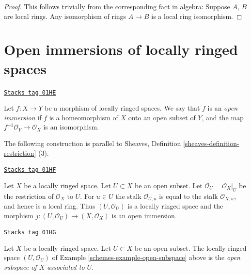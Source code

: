 \begin{proof}
This follows trivially from the corresponding fact in algebra:
Suppose $A$, $B$ are local rings. Any isomorphism of rings
$A \to B$ is a local ring isomorphism.
\end{proof}

\section{Open immersions of locally ringed spaces}
\label{schemes-section-open-immersion}
\begin{definition}
\label{schemes-definition-immersion-locally-ringed-spaces}
\href{https://stacks.math.columbia.edu/tag/01HE}{\texttt{Stacks tag 01HE}}

Let $f : X \to Y$ be a morphism of locally ringed spaces.
We say that $f$ is an {\it open immersion} if
$f$ is a homeomorphism of $X$ onto an open subset
of $Y$, and the map $f^{-1}\mathcal{O}_Y \to \mathcal{O}_X$
is an isomorphism.
\end{definition}

The following construction is parallel to
Sheaves, Definition \ref{sheaves-definition-restriction} (3).

\begin{example}
\label{schemes-example-open-subspace}
\href{https://stacks.math.columbia.edu/tag/01HF}{\texttt{Stacks tag 01HF}}

Let $X$ be a locally ringed space.
Let $U \subset X$ be an open subset.
Let $\mathcal{O}_U = \mathcal{O}_X|_U$
be the restriction of $\mathcal{O}_X$ to $U$.
For $u \in U$ the stalk $\mathcal{O}_{U, u}$
is equal to the stalk $\mathcal{O}_{X, u}$, and hence is a
local ring. Thus $(U, \mathcal{O}_U)$ is a locally ringed
space and the morphism $j : (U, \mathcal{O}_U) \to (X, \mathcal{O}_X)$
is an open immersion.
\end{example}

\begin{definition}
\label{schemes-definition-open-subspace}
\href{https://stacks.math.columbia.edu/tag/01HG}{\texttt{Stacks tag 01HG}}

Let $X$ be a locally ringed space.
Let $U \subset X$ be an open subset.
The locally ringed space $(U, \mathcal{O}_U)$
of Example \ref{schemes-example-open-subspace} above
is the {\it open subspace of $X$ associated to $U$}.
\end{definition}

